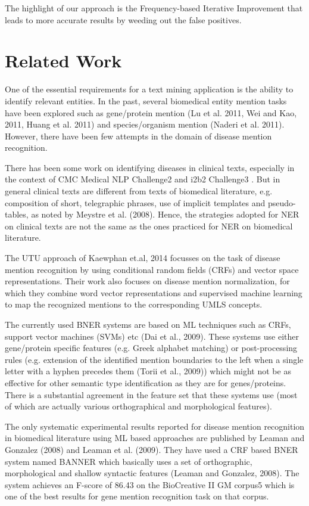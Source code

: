 \documentclass{article}
\begin{document}
The highlight of our approach is the ​Frequency-based Iterative Improvement that leads to more accurate results by weeding out the false positives.


\section{Related Work}
One of the essential requirements for a text mining application is the ability to identify relevant entities. In the past, several biomedical entity mention tasks have been explored such as gene/protein mention (Lu et al. 2011, Wei and Kao, 2011, Huang et al. 2011) and species/organism mention (Naderi et al. 2011). However, there have been few attempts in the domain of disease mention recognition.

There has been some work on identifying diseases in clinical texts, especially in the
context of CMC Medical NLP Challenge2 and i2b2 Challenge3 . But in general clinical texts
are different from texts of biomedical literature, e.g. composition of short, telegraphic
phrases, use of implicit templates and pseudo-tables, as noted by Meystre et al. (2008).
Hence, the strategies adopted for NER on clinical texts are not the same as the ones
practiced for NER on biomedical literature.

The UTU approach of Kaewphan et.al, 2014 focusses on the task of disease mention
recognition by using conditional random fields (CRFs) and vector space representations.
Their work also focuses on disease mention normalization, for which they combine word
vector representations and supervised machine learning to map the recognized
mentions to the corresponding UMLS concepts.

The currently used BNER systems are based on ML techniques such as CRFs, support
vector machines (SVMs) etc (Dai et al., 2009). These systems use either gene/protein
specific features (e.g. Greek alphabet matching) or post-processing rules (e.g. extension
of the identified mention boundaries to the left when a single letter with a hyphen
precedes them (Torii et al., 2009)) which might not be as effective for other semantic type identification as they are for genes/proteins. There is a substantial agreement in the feature set that these systems use (most of which are actually various orthographical and morphological features).

The only systematic experimental results reported for disease mention recognition in
biomedical literature using ML based approaches are published by Leaman and Gonzalez
(2008) and Leaman et al. (2009). They have used a CRF based BNER system named
BANNER which basically uses a set of orthographic, morphological and shallow syntactic features (Leaman and Gonzalez, 2008). The system achieves an F-score of 86.43 on the
BioCreative II GM corpus5 which is one of the best results for gene mention recognition
task on that corpus.
\end{document}
